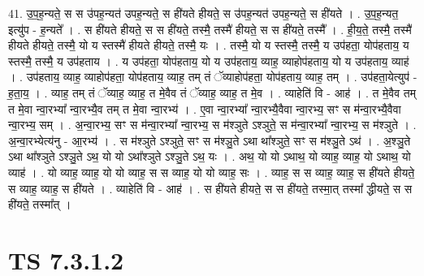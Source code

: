 \documentclass[17pt]{extarticle}
\begin{document}
41. उ॒प॒ह॒न्यते॒ स स उ॑पह॒न्यत॑ उपह॒न्यते॒ स ही॑यते हीयते॒ स उ॑पह॒न्यत॑ उपह॒न्यते॒ स ही॑यते । . उ॒प॒ह॒न्यत॒ इत्यु॑प - ह॒न्यते᳚ । . स ही॑यते हीयते॒ स स ही॑यते॒ तस्मै॒ तस्मै॑ हीयते॒ स स ही॑यते॒ तस्मै᳚ । . ही॒य॒ते॒ तस्मै॒ तस्मै॑ हीयते हीयते॒ तस्मै॒ यो य स्तस्मै॑ हीयते हीयते॒ तस्मै॒ यः । . तस्मै॒ यो य स्तस्मै॒ तस्मै॒ य उप॑हता॒ योप॑हताय॒ य स्तस्मै॒ तस्मै॒ य उप॑हताय । . य उप॑हता॒ योप॑हताय॒ यो य उप॑हताय॒ व्याह॒ व्याहोप॑हताय॒ यो य उप॑हताय॒ व्याह॑ । . उप॑हताय॒ व्याह॒ व्याहोप॑हता॒ योप॑हताय॒ व्याह॒ तम् तं ॅव्याहोप॑हता॒ योप॑हताय॒ व्याह॒ तम् । . उप॑हता॒येत्युप॑ - ह॒ता॒य॒ । . व्याह॒ तम् तं ॅव्याह॒ व्याह॒ त मे॒वैव तं ॅव्याह॒ व्याह॒ त मे॒व । . व्याहेति॑ वि - आह॑ । . त मे॒वैव तम् त मे॒वा न्वा॒रभ्या᳚ न्वा॒रभ्यै॒व तम् त मे॒वा न्वा॒रभ्य॑ । . ए॒वा न्वा॒रभ्या᳚ न्वा॒रभ्यै॒वैवा न्वा॒रभ्य॒ सꣳ स म॑न्वा॒रभ्यै॒वैवा न्वा॒रभ्य॒ सम् । . अ॒न्वा॒रभ्य॒ सꣳ स म॑न्वा॒रभ्या᳚ न्वा॒रभ्य॒ स म॑श्ञुते ऽश्ञुते॒ स म॑न्वा॒रभ्या᳚ न्वा॒रभ्य॒ स म॑श्ञुते । . अ॒न्वा॒रभ्येत्य॑नु - आ॒रभ्य॑ । . स म॑श्ञुते ऽश्ञुते॒ सꣳ स म॑श्ञु॒ते ऽथा था᳚श्ञुते॒ सꣳ स म॑श्ञु॒ते ऽथ॑ । . अ॒श्ञु॒ते ऽथा था᳚श्ञुते ऽश्ञु॒ते ऽथ॒ यो यो ऽथा᳚श्ञुते ऽश्ञु॒ते ऽथ॒ यः । . अथ॒ यो यो ऽथाथ॒ यो व्याह॒ व्याह॒ यो ऽथाथ॒ यो व्याह॑ । . यो व्याह॒ व्याह॒ यो यो व्याह॒ स स व्याह॒ यो यो व्याह॒ सः । . व्याह॒ स स व्याह॒ व्याह॒ स ही॑यते हीयते॒ स व्याह॒ व्याह॒ स ही॑यते । . व्याहेति॑ वि - आह॑ । . स ही॑यते हीयते॒ स स ही॑यते॒ तस्मा॒त् तस्मा᳚ द्धीयते॒ स स ही॑यते॒ तस्मा᳚त् । \newline
\pagebreak
{}

\section{ TS 7.3.1.2 }
\end{document}
